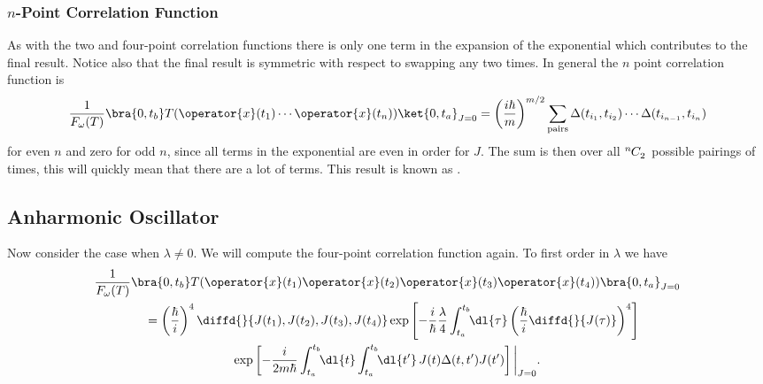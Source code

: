 \documentclass[fleqn]{NotesClass}
\newcommand*{\timeorder}{T}
\begin{document}
    \subsubsection{\(n\)-Point Correlation Function}
    As with the two and four-point correlation functions there is only one term in the expansion of the exponential which contributes to the final result.
    Notice also that the final result is symmetric with respect to swapping any two times.
    In general the \(n\) point correlation function is
    \begin{equation}
        \frac{1}{F_{\omega}(T)} \bra{0, t_b} \timeorder(\operator{x}(t_1) \dotsm \operator{x}(t_n)) \ket{0, t_a}_{J = 0} = \left( \frac{i\hbar}{m} \right)^{m/2} \sum_{\text{pairs}} \Delta(t_{i_1}, t_{i_2}) \dotsm \Delta(t_{i_{n-1}}, t_{i_n})
    \end{equation}
    for even \(n\) and zero for odd \(n\), since all terms in the exponential are even in order for \(J\).
    The sum is then over all \(\tensor[^n]{C}{_2}\) possible pairings of times, this will quickly mean that there are a lot of terms.
    This result is known as .
    
    \subsection{Anharmonic Oscillator}
    Now consider the case when \(\lambda \ne 0\).
    We will compute the four-point correlation function again.
    To first order in \(\lambda\) we have
    \begin{multline}
        \frac{1}{F_{\omega}(T)} \bra{0, t_b} \timeorder (\operator{x}(t_1)\operator{x}(t_2)\operator{x}(t_3)\operator{x}(t_4)) \bra{0, t_a}_{J=0}\\
        \quad= \left( \frac{\hbar}{i} \right)^4 \diffd{}{J(t_1),J(t_2),J(t_3),J(t_4)} \exp\left[ -\frac{i}{\hbar} \frac{\lambda}{4} \int_{t_a}^{t_b} \!\! \dl{\tau} \left( \frac{\hbar}{i} \diffd{}{J(\tau)} \right)^4 \right]\\
        \exp\left[ -\frac{i}{2m\hbar} \int_{t_a}^{t_b} \!\! \dl{t} \int_{t_a}^{t_b} \!\! \dl{t'} \, J(t)\Delta(t, t')J(t') \right] \bigg\vert_{J=0}.
    \end{multline}
    
\end{document}
